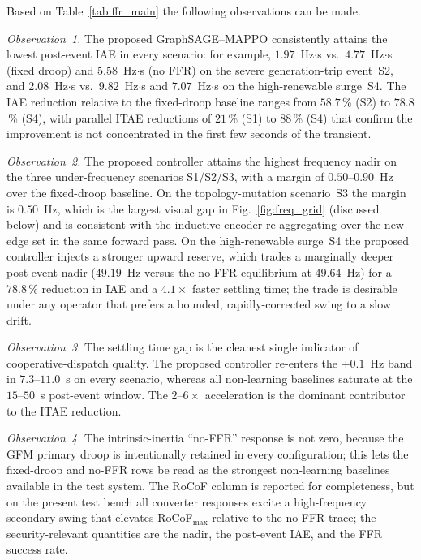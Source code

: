 Based on Table~\ref{tab:ffr_main} the following observations can be
made.

\emph{Observation~1.} The proposed GraphSAGE--MAPPO consistently
attains the lowest post-event IAE in every scenario: for example,
$1.97$~Hz$\cdot$s vs.\ $4.77$~Hz$\cdot$s (fixed droop) and
$5.58$~Hz$\cdot$s (no FFR) on the severe generation-trip event~S2,
and $2.08$~Hz$\cdot$s vs.\ $9.82$~Hz$\cdot$s and $7.07$~Hz$\cdot$s
on the high-renewable surge~S4. The IAE reduction relative to the
fixed-droop baseline ranges from $58.7$\,\% (S2) to $78.8$\,\%
(S4), with parallel ITAE reductions of $21$\,\% (S1) to $88$\,\%
(S4) that confirm the improvement is not concentrated in the first
few seconds of the transient.

\emph{Observation~2.} The proposed controller attains the highest
frequency nadir on the three under-frequency scenarios S1/S2/S3,
with a margin of $0.50$--$0.90$~Hz over the fixed-droop baseline.
On the topology-mutation scenario~S3 the margin is $0.50$~Hz, which
is the largest visual gap in Fig.~\ref{fig:freq_grid} (discussed
below) and is consistent with the inductive encoder re-aggregating
over the new edge set in the same forward pass. On the
high-renewable surge~S4 the proposed controller injects a stronger
upward reserve, which trades a marginally deeper post-event nadir
($49.19$~Hz versus the no-FFR equilibrium at $49.64$~Hz) for a
$78.8$\,\% reduction in IAE and a $4.1\times$ faster settling time;
the trade is desirable under any operator that prefers a bounded,
rapidly-corrected swing to a slow drift.

\emph{Observation~3.} The settling time gap is the cleanest single
indicator of cooperative-dispatch quality. The proposed controller
re-enters the $\pm 0.1$~Hz band in $7.3$--$11.0$~s on every
scenario, whereas all non-learning baselines saturate at the
$15$--$50$~s post-event window. The $2$--$6\times$ acceleration is
the dominant contributor to the ITAE reduction.

\emph{Observation~4.} The intrinsic-inertia ``no-FFR'' response is
not zero, because the GFM primary droop is intentionally retained
in every configuration; this lets the fixed-droop and no-FFR rows be
read as the strongest non-learning baselines available in the test
system. The RoCoF column is reported for completeness, but on the
present test bench all converter responses excite a high-frequency
secondary swing that elevates RoCoF$_{\max}$ relative to the
no-FFR trace; the security-relevant quantities are the nadir, the
post-event IAE, and the FFR success rate.

